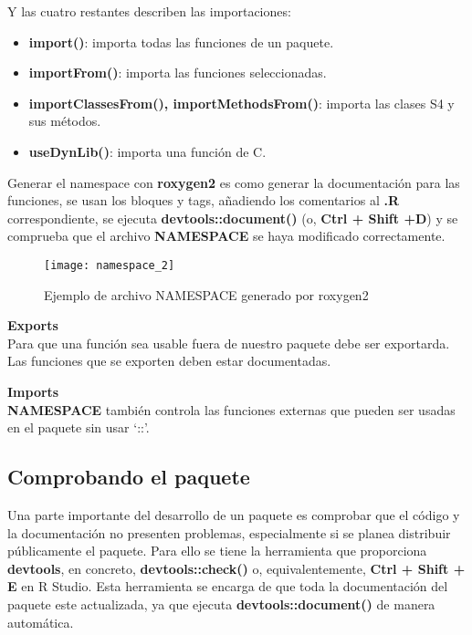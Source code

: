 Y las cuatro restantes describen las importaciones:
\begin{itemize}
    \item \textbf{import()}: importa todas las funciones de un paquete.
    \item \textbf{importFrom()}: importa las funciones seleccionadas.
    \item \textbf{importClassesFrom(), importMethodsFrom()}: importa las clases S4 y sus
m\'etodos.
    \item \textbf{useDynLib()}: importa una funci\'on de C.
\end{itemize}

Generar el namespace con \textbf{roxygen2} es como generar la documentaci\'on para las funciones,
se usan los bloques y tags, a\~nadiendo los comentarios al \textbf{.R} correspondiente, se ejecuta
\textbf{devtools::document()} (o, \textbf{Ctrl + Shift +D}) y se comprueba que el archivo \textbf{NAMESPACE} se
haya modificado correctamente.\\

\begin{figure}[H]
    \centering
    \texttt{[image: namespace\_2]}
    \caption{Ejemplo de archivo NAMESPACE generado por roxygen2 }
    \label{fig:namespace}
\end{figure} 

\textbf{Exports}\\
Para que una funci\'on sea usable fuera de nuestro paquete debe ser exportarda. Las funciones que se exporten deben estar documentadas.

\textbf{Imports}\\
\textbf{NAMESPACE} tambi\'en controla las funciones externas que pueden ser usadas en el
paquete sin usar \enquote*{::}.

\subsection{Comprobando el paquete}

Una parte importante del desarrollo de un paquete es comprobar que el c\'odigo y la
documentaci\'on no presenten problemas, especialmente si se planea distribuir p\'ublicamente
el paquete. Para ello se tiene la herramienta que proporciona \textbf{devtools}, en concreto,
\textbf{devtools::check()} o, equivalentemente, \textbf{Ctrl + Shift + E} en R Studio.
Esta herramienta se encarga de que toda la documentaci\'on del paquete este actualizada, ya
que ejecuta \textbf{devtools::document()} de manera autom\'atica.

